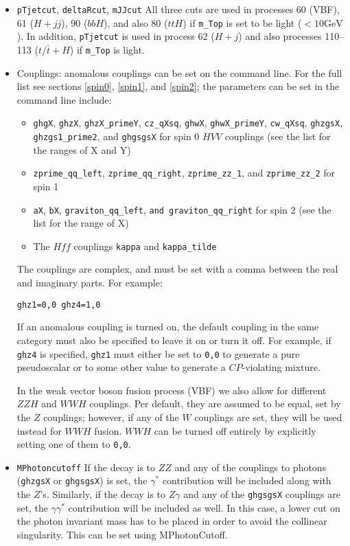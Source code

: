 \documentclass[aps,superscriptaddress,nofootinbib]{revtex4}
\begin{document}
\begin{itemize}
\item \verb|pTjetcut|, \verb|deltaRcut|, \verb|mJJcut| All three cuts are used in processes 60 (VBF), 61 ($H+jj$), 90 ($bbH$), and also 80 ($ttH$) if \verb|m_Top| is set to be light ($<10 \text{GeV}$).  In addition, \verb|pTjetcut| is used in process 62 ($H+j$) and also processes 110--113 ($t/\bar{t}+H$) if \verb|m_Top| is light.
\item Couplings: anomalous couplings can be set on the command line.  For the full list see sections \ref{spin0}, \ref{spin1}, and \ref{spin2}; the parameters can be set in the command line include:
\begin{itemize}
\item \verb|ghgX|, \verb|ghzX|, \verb|ghzX_primeY|, \verb|cz_qXsq|, \verb|ghwX|, \verb|ghwX_primeY|, \verb|cw_qXsq|, \verb|ghzgsX|, \verb|ghzgs1_prime2|, and \verb|ghgsgsX| for spin 0 $HVV$ couplings (see the list for the ranges of X and Y)
\item \verb|zprime_qq_left|, \verb|zprime_qq_right|, \verb|zprime_zz_1|, and \verb|zprime_zz_2| for spin 1
\item \verb|aX|, \verb|bX|, \verb|graviton_qq_left|, \verb|and graviton_qq_right| for spin 2 (see the list for the range of X)
\item The $Hff$ couplings \verb|kappa| and \verb|kappa_tilde|
\end{itemize}
The couplings are complex, and must be set with a comma between the real and imaginary parts.  For example:
\begin{verbatim}
ghz1=0,0 ghz4=1,0
\end{verbatim}
If an anomalous coupling is turned on, the default coupling in the same category must also be specified to leave it on or turn it off.  For example, if \verb|ghz4| is specified, \verb|ghz1| must either be set to \verb|0,0| to generate a pure pseudoscalar or to some other value to generate a $CP$-violating mixture.

In the weak vector boson fusion process (VBF) we also allow for different $ZZH$ and $WWH$ couplings.  Per default, they are assumed to be equal, set by the $Z$ couplings; however, if any of the $W$ couplings are set, they will be used instead for $WWH$ fusion.  $WWH$ can be turned off entirely by explicitly setting one of them to \verb|0,0|.

\item \verb|MPhotoncutoff| If the decay is to $ZZ$ and any of the couplings to photons (\verb|ghzgsX| or \verb|ghgsgsX|) is set, the $\gamma^*$ contribution will be included along with the $Z$'s.  Similarly, if the decay is to $Z\gamma$ and any of the \verb|ghgsgsX| couplings are set, the $\gamma\gamma^*$ contribution will be included as well.  In this case, a lower cut on the photon invariant mass has to be placed in order to avoid the collinear singularity.  This can be set using MPhotonCutoff.
\end{itemize}
\end{document}
